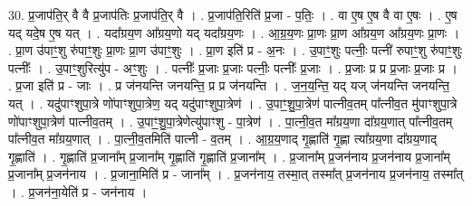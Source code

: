 \documentclass[17pt]{extarticle}
\begin{document}
30. प्र॒जाप॑ति॒र् वै वै प्र॒जाप॑तिः प्र॒जाप॑ति॒र् वै । . प्र॒जाप॑ति॒रिति॑ प्र॒जा - प॒तिः॒ । . वा ए॒ष ए॒ष वै वा ए॒षः । . ए॒ष यद् यदे॒ष ए॒ष यत् । . यदा᳚ग्रय॒ण आ᳚ग्रय॒णो यद् यदा᳚ग्रय॒णः । . आ॒ग्र॒य॒णः प्रा॒णः प्रा॒ण आ᳚ग्रय॒ण आ᳚ग्रय॒णः प्रा॒णः । . प्रा॒ण उ॑पाꣳ॒॒शु रु॑पाꣳ॒॒शुः प्रा॒णः प्रा॒ण उ॑पाꣳ॒॒शुः । . प्रा॒ण इति॑ प्र - अ॒नः । . उ॒पाꣳ॒॒शुः पत्नीः॒ पत्नी॑ रुपाꣳ॒॒शु रु॑पाꣳ॒॒शुः पत्नीः᳚ । . उ॒पाꣳ॒॒शुरित्यु॑प - अꣳ॒॒शुः । . पत्नीः᳚ प्र॒जाः प्र॒जाः पत्नीः॒ पत्नीः᳚ प्र॒जाः । . प्र॒जाः प्र प्र प्र॒जाः प्र॒जाः प्र । . प्र॒जा इति॑ प्र - जाः । . प्र ज॑नयन्ति जनयन्ति॒ प्र प्र ज॑नयन्ति । . ज॒न॒य॒न्ति॒ यद् यज् ज॑नयन्ति जनयन्ति॒ यत् । . यदु॑पाꣳशुपा॒त्रे णो॑पाꣳशुपा॒त्रेण॒ यद् यदु॑पाꣳशुपा॒त्रेण॑ । . उ॒पाꣳ॒॒शु॒पा॒त्रेण॑ पात्नीव॒तम् पा᳚त्नीव॒त मु॑पाꣳशुपा॒त्रे णो॑पाꣳशुपा॒त्रेण॑ पात्नीव॒तम् । . उ॒पाꣳ॒॒शु॒पा॒त्रेणेत्यु॑पाꣳशु - पा॒त्रेण॑ । . पा॒त्नी॒व॒त मा᳚ग्रय॒णा दा᳚ग्रय॒णात् पा᳚त्नीव॒तम् पा᳚त्नीव॒त मा᳚ग्रय॒णात् । . पा॒त्नी॒व॒तमिति॑ पात्नी - व॒तम् । . आ॒ग्र॒य॒णाद् गृ॒ह्णाति॑ गृ॒ह्णा त्या᳚ग्रय॒णा दा᳚ग्रय॒णाद् गृ॒ह्णाति॑ । . गृ॒ह्णाति॑ प्र॒जाना᳚म् प्र॒जाना᳚म् गृ॒ह्णाति॑ गृ॒ह्णाति॑ प्र॒जाना᳚म् । . प्र॒जाना᳚म् प्र॒जन॑नाय प्र॒जन॑नाय प्र॒जाना᳚म् प्र॒जाना᳚म् प्र॒जन॑नाय । . प्र॒जाना॒मिति॑ प्र - जाना᳚म् । . प्र॒जन॑नाय॒ तस्मा॒त् तस्मा᳚त् प्र॒जन॑नाय प्र॒जन॑नाय॒ तस्मा᳚त् । . प्र॒जन॑ना॒येति॑ प्र - जन॑नाय । \newline
\end{document}

